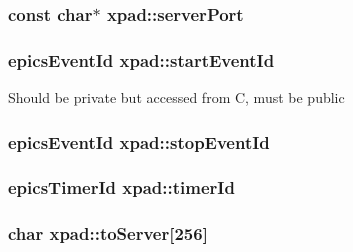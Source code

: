 \hypertarget{classxpad_a965f7dd05153aa6d99ba9a3a8e0e9db8}{
\subsubsection[{server\-Port}]{\setlength{\rightskip}{0pt plus 5cm}const char$\ast$ {\bf xpad\-::server\-Port}}}\label{classxpad_a965f7dd05153aa6d99ba9a3a8e0e9db8}
\hypertarget{classxpad_aca4efe99abea333e025cc2aec3350c17}{
\subsubsection[{start\-Event\-Id}]{\setlength{\rightskip}{0pt plus 5cm}epics\-Event\-Id {\bf xpad\-::start\-Event\-Id}}}\label{classxpad_aca4efe99abea333e025cc2aec3350c17}
\-Should be private but accessed from \-C, must be public \hypertarget{classxpad_a835f854ed3b92d3bc8eb4e2b1014c43c}{
\subsubsection[{stop\-Event\-Id}]{\setlength{\rightskip}{0pt plus 5cm}epics\-Event\-Id {\bf xpad\-::stop\-Event\-Id}}}\label{classxpad_a835f854ed3b92d3bc8eb4e2b1014c43c}
\hypertarget{classxpad_ac3aa333c231dc3f8a811a2301a3db32c}{
\subsubsection[{timer\-Id}]{\setlength{\rightskip}{0pt plus 5cm}epics\-Timer\-Id {\bf xpad\-::timer\-Id}}}\label{classxpad_ac3aa333c231dc3f8a811a2301a3db32c}
\hypertarget{classxpad_add9855faa308738d97cfc8cae9c29831}{
\subsubsection[{to\-Server}]{\setlength{\rightskip}{0pt plus 5cm}char {\bf xpad\-::to\-Server}\mbox{[}256\mbox{]}}}\label{classxpad_add9855faa308738d97cfc8cae9c29831}
